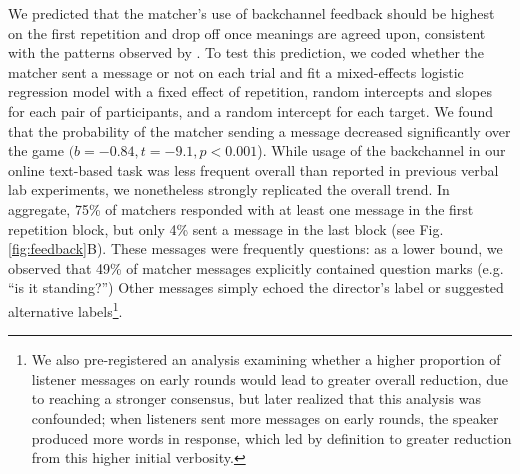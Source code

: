 \documentclass[alpha-refs]{wiley-article}
\begin{document}
We predicted that the matcher's use of backchannel feedback should be highest on the first repetition and drop off once meanings are agreed upon, consistent with the patterns observed by \citep{ClarkWilkesGibbs86_ReferringCollaborative}.
To test this prediction, we coded whether the matcher sent a message or not on each trial and fit a mixed-effects logistic regression model with a fixed effect of repetition, random intercepts and slopes for each pair of participants, and a random intercept for each target.
We found that the probability of the matcher sending a message decreased significantly over the game $(b=-0.84, t = -9.1, p < 0.001$).
While usage of the backchannel in our online text-based task was less frequent overall than reported in previous verbal lab experiments, we nonetheless strongly replicated the overall trend.
In aggregate, 75\% of matchers responded with at least one message in the first repetition block, but only 4\% sent a message in the last block (see Fig. \ref{fig:feedback}B).
These messages were frequently questions: as a lower bound, we observed that 49\% of matcher messages explicitly contained question marks (e.g. ``is it standing?'')
Other messages simply echoed the director's label or suggested alternative labels\footnote{We also pre-registered an analysis examining whether a higher proportion of listener messages on early rounds would lead to greater overall reduction, due to reaching a stronger consensus, but later realized that this analysis was confounded; when listeners sent more messages on early rounds, the speaker produced more words in response, which led by definition to greater reduction from this higher initial verbosity.}.
\end{document}
